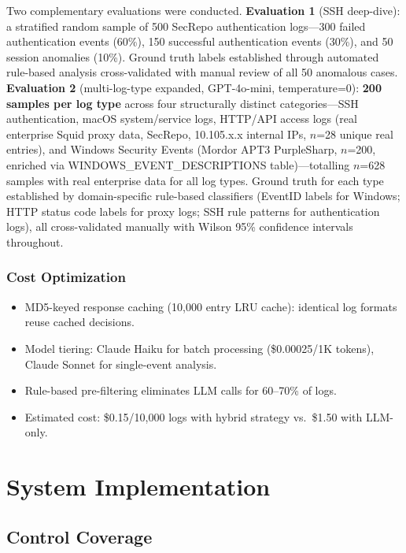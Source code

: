 \documentclass[futureinternet,article,submit,pdftex,moreauthors]{Definitions/mdpi}
\begin{document}
Two complementary evaluations were conducted. \textbf{Evaluation 1} (SSH deep-dive): a
stratified random sample of 500 SecRepo authentication logs---300 failed authentication events
(60\%), 150 successful authentication events (30\%), and 50 session anomalies (10\%). Ground
truth labels established through automated rule-based analysis cross-validated with manual
review of all 50 anomalous cases. \textbf{Evaluation 2} (multi-log-type expanded,
GPT-4o-mini, temperature=0): \textbf{200 samples per log type} across four structurally
distinct categories---SSH authentication, macOS system/service logs, HTTP/API access logs
(real enterprise Squid proxy data, SecRepo, 10.105.x.x internal IPs, $n$=28 unique real
entries), and Windows Security Events (Mordor APT3 PurpleSharp, $n$=200, enriched via
WINDOWS\_EVENT\_DESCRIPTIONS table)---totalling $n$=628 samples with real enterprise data
for all log types. Ground truth for each type established by domain-specific rule-based
classifiers (EventID labels for Windows; HTTP status code labels for proxy logs; SSH
rule patterns for authentication logs), all cross-validated manually with Wilson 95\%
confidence intervals throughout.

\subsubsection{Cost Optimization}

\begin{itemize}
\item MD5-keyed response caching (10{,}000 entry LRU cache): identical log formats reuse
cached decisions.
\item Model tiering: Claude Haiku for batch processing (\$0.00025/1K tokens), Claude Sonnet
for single-event analysis.
\item Rule-based pre-filtering eliminates LLM calls for 60--70\% of logs.
\item Estimated cost: \$0.15/10{,}000 logs with hybrid strategy vs.\ \$1.50 with LLM-only.
\end{itemize}

\section{System Implementation}
\label{sec:impl}

\subsection{Control Coverage}
\end{document}

